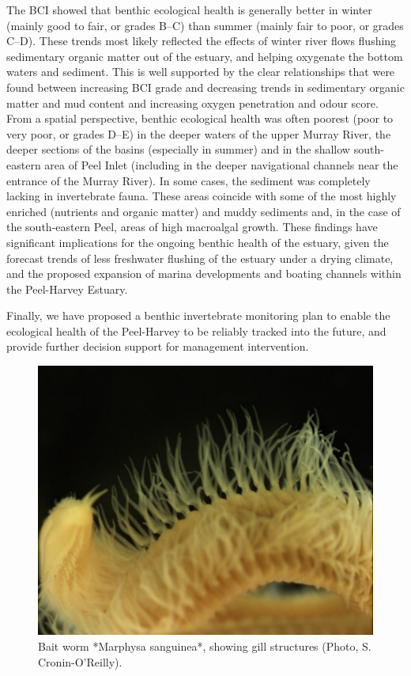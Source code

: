 \documentclass[
]{book}
\begin{document}
The BCI showed that benthic ecological health is generally better in winter (mainly good to fair, or grades B--C) than summer (mainly fair to poor, or grades C--D). These trends most likely reflected the effects of winter river flows flushing sedimentary organic matter out of the estuary, and helping oxygenate the bottom waters and sediment. This is well supported by the clear relationships that were found between increasing BCI grade and decreasing trends in sedimentary organic matter and mud content and increasing oxygen penetration and odour score. From a spatial perspective, benthic ecological health was often poorest (poor to very poor, or grades D--E) in the deeper waters of the upper Murray River, the deeper sections of the basins (especially in summer) and in the shallow south-eastern area of Peel Inlet (including in the deeper navigational channels near the entrance of the Murray River). In some cases, the sediment was completely lacking in invertebrate fauna. These areas coincide with some of the most highly enriched (nutrients and organic matter) and muddy sediments and, in the case of the south-eastern Peel, areas of high macroalgal growth. These findings have significant implications for the ongoing benthic health of the estuary, given the forecast trends of less freshwater flushing of the estuary under a drying climate, and the proposed expansion of marina developments and boating channels within the Peel-Harvey Estuary.

Finally, we have proposed a benthic invertebrate monitoring plan to enable the ecological health of the Peel-Harvey to be reliably tracked into the future, and provide further decision support for management intervention.

\begin{figure}
\includegraphics[width=0.89\linewidth]{images/BMI/picture2} \caption{Bait worm *Marphysa sanguinea*, showing gill structures (Photo, S. Cronin-O’Reilly).}\label{fig:BMI-pic2}
\end{figure}
\end{document}
